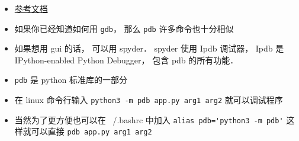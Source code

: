 
\begin{issues}
\issueDraft
\end{issues}

\begin{itemize}
\item \href{https://docs.python.org/3/library/pdb.html}{参考文档}
\item 如果你已经知道如何用 \verb|gdb|， 那么 \verb|pdb| 许多命令也十分相似
\item 如果想用 gui 的话， 可以用 spyder． spyder 使用 Ipdb 调试器， Ipdb 是 IPython-enabled Python Debugger， 包含 pdb 的所有功能．
\item \verb|pdb| 是 python 标准库的一部分
\item 在 linux 命令行输入 \verb|python3 -m pdb app.py arg1 arg2| 就可以调试程序
\item 当然为了更方便也可以在 ~/.bashrc 中加入 \verb|alias pdb='python3 -m pdb'| 这样就可以直接 \verb|pdb app.py arg1 arg2|
\end{itemize}
